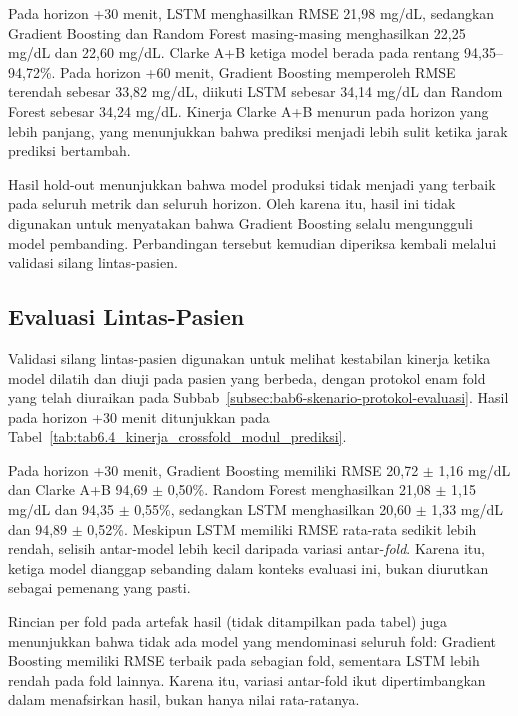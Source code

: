 

Pada horizon +30 menit, LSTM menghasilkan RMSE 21,98 mg/dL, sedangkan Gradient Boosting dan Random Forest masing-masing menghasilkan 22,25 mg/dL dan
22,60 mg/dL. Clarke A+B ketiga model berada pada rentang 94,35--94,72\%. Pada horizon +60 menit, Gradient Boosting memperoleh RMSE terendah sebesar
33,82 mg/dL, diikuti LSTM sebesar 34,14 mg/dL dan Random Forest sebesar 34,24 mg/dL. Kinerja Clarke A+B menurun pada horizon yang lebih panjang,
yang menunjukkan bahwa prediksi menjadi lebih sulit ketika jarak prediksi bertambah.

Hasil hold-out menunjukkan bahwa model produksi tidak menjadi yang terbaik pada seluruh metrik dan seluruh horizon. Oleh karena itu, hasil ini tidak digunakan
untuk menyatakan bahwa Gradient Boosting selalu mengungguli model pembanding. Perbandingan tersebut kemudian diperiksa kembali melalui validasi silang
lintas-pasien.

\subsection{Evaluasi Lintas-Pasien}
\label{subsec:bab6-evaluasi-crossfold-prediksi}

Validasi silang lintas-pasien digunakan untuk melihat kestabilan kinerja ketika model dilatih dan diuji pada pasien yang berbeda, dengan protokol enam
fold yang telah diuraikan pada Subbab~\ref{subsec:bab6-skenario-protokol-evaluasi}. Hasil pada horizon +30 menit ditunjukkan pada Tabel~\ref{tab:tab6.4_kinerja_crossfold_modul_prediksi}.



Pada horizon +30 menit, Gradient Boosting memiliki RMSE 20,72 $\pm$ 1,16 mg/dL dan Clarke A+B 94,69 $\pm$ 0,50\%. Random Forest menghasilkan
21,08 $\pm$ 1,15 mg/dL dan 94,35 $\pm$ 0,55\%, sedangkan LSTM menghasilkan 20,60 $\pm$ 1,33 mg/dL dan 94,89 $\pm$ 0,52\%. Meskipun LSTM memiliki
RMSE rata-rata sedikit lebih rendah, selisih antar-model lebih kecil daripada variasi antar-\textit{fold}. Karena itu, ketiga model dianggap sebanding dalam
konteks evaluasi ini, bukan diurutkan sebagai pemenang yang pasti.

Rincian per fold pada artefak hasil (tidak ditampilkan pada tabel) juga menunjukkan bahwa tidak ada model yang mendominasi seluruh fold: Gradient Boosting
memiliki RMSE terbaik pada sebagian fold, sementara LSTM lebih rendah pada fold lainnya. Karena itu, variasi antar-fold ikut dipertimbangkan dalam
menafsirkan hasil, bukan hanya nilai rata-ratanya.

